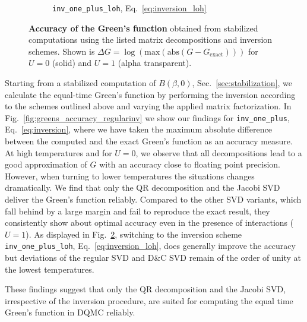 \documentclass[submission, Phys]{SciPost}
\begin{document}
\begin{figure}
\begin{subfigure}{0.48\textwidth}
\caption{\texttt{inv\_one\_plus\_loh}, Eq.~\ref{eq:inversion_loh} \label{fig:greens_accuracy_loh}}
	\end{subfigure}
	\vspace{5pt}
	\caption{\textbf{Accuracy of the Green's function} obtained from stabilized computations using the listed matrix decompositions and inversion schemes. Shown is ${\Delta G = \log(\textrm{max}(\textrm{abs}(G - G_{\textrm{exact}})))}$ for $U=0$ (solid) and $U=1$ (alpha transparent).}
\end{figure}

Starting from a stabilized computation of $B(\beta,0)$, Sec.~\ref{sec:stabilization}, we calculate the equal-time Green's function by performing the inversion according to the schemes outlined above and varying the applied matrix factorization. In Fig.~\ref{fig:greens_accuracy_regularinv} we show our findings for \texttt{inv\_one\_plus}, Eq.~\ref{eq:inversion}, where we have taken the maximum absolute difference between the computed and the exact Green's function as an accuracy measure. At high temperatures and for $U=0$, we observe that all decompositions lead to a good approximation of $G$ with an accuracy close to floating point precision. However, when turning to lower temperatures the situations changes dramatically. We find that only the QR decomposition and the Jacobi SVD deliver the Green's function reliably. Compared to the other SVD variants, which fall behind by a large margin and fail to reproduce the exact result, they consistently show about optimal accuracy even in the presence of interactions ($U=1$). As displayed in Fig.~\ref{fig:greens_accuracy_loh}, switching to the inversion scheme \texttt{inv\_one\_plus\_loh}, Eq.~\ref{eq:inversion_loh}, does generally improve the accuracy but deviations of the regular SVD and D\&C SVD remain of the order of unity at the lowest temperatures.

These findings suggest that only the QR decomposition and the Jacobi SVD, irrespective of the inversion procedure, are suited for computing the equal time Green's function in DQMC reliably.
\end{document}
